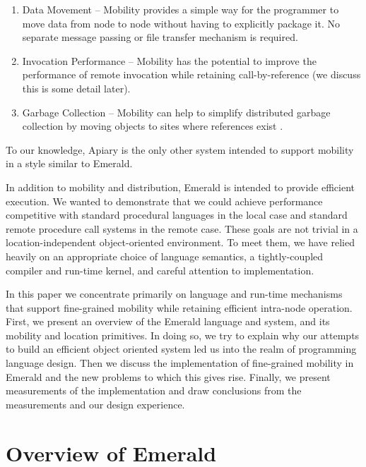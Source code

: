 \begin{enumerate}
\item Data Movement -- Mobility provides a simple way for the programmer
to move data from node to node without having to explicitly package
it.  No separate message passing or file transfer mechanism is required.

\item Invocation Performance -- Mobility has the potential to improve the
performance of remote invocation while retaining call-by-reference
(we discuss this is some detail later).

\item Garbage Collection -- Mobility can help to simplify distributed
garbage collection by moving objects to sites where references 
exist \cite{vestal}.
\end{enumerate}

To our knowledge, Apiary \cite{Hewitt80} is the only other system
intended to support mobility in a style similar to Emerald.

In addition to mobility and distribution, Emerald is intended to
provide efficient execution.  We wanted to demonstrate that
we could achieve performance competitive with standard procedural
languages in the local case and standard remote procedure call
systems in the remote case.  These goals are not trivial
in a location-independent object-oriented
environment.  To meet them, we have
relied heavily on an appropriate choice of language semantics, a tightly-coupled compiler 
and run-time kernel, and careful attention to implementation.

In this paper we concentrate primarily on language and run-time
mechanisms that support fine-grained
mobility while retaining efficient intra-node operation.  First, we 
present an overview of the Emerald language and system, and its
mobility and location primitives.  In doing so, we try to explain why our
attempts to build an efficient object oriented system led us into the realm
of programming language design. Then  
we discuss the implementation of
fine-grained mobility in Emerald and the new problems to which this gives
rise.  Finally, we present
measurements of the implementation and draw conclusions from the
measurements and our design experience.  

\section{Overview of Emerald}

